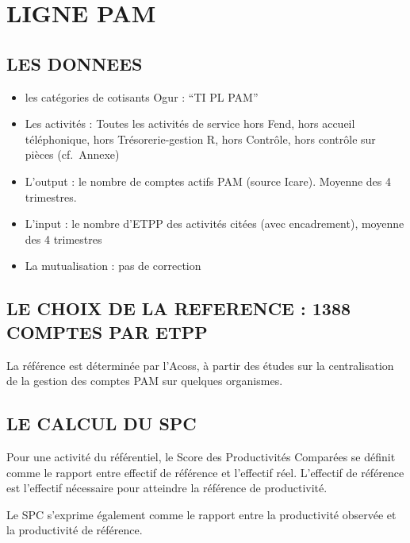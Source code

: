 \documentclass[
]{book}
\begin{document}
\hypertarget{ligne-pam}{%
\chapter{LIGNE PAM}\label{ligne-pam}}

\hypertarget{les-donnees-9}{%
\section{LES DONNEES}\label{les-donnees-9}}

\begin{itemize}
\item
  les catégories de cotisants Ogur : ``TI PL PAM''
\item
  Les activités :
  Toutes les activités de service hors Fend, hors accueil téléphonique, hors Trésorerie-gestion R, hors Contrôle, hors contrôle sur pièces (cf.~Annexe)
\item
  L'output : le nombre de comptes actifs PAM (source Icare). Moyenne des 4 trimestres.
\item
  L'input : le nombre d'ETPP des activités citées (avec encadrement), moyenne des 4 trimestres
\item
  La mutualisation : pas de correction
\end{itemize}

\hypertarget{le-choix-de-la-reference-1388-comptes-par-etpp}{%
\section{LE CHOIX DE LA REFERENCE : 1388 COMPTES PAR ETPP}\label{le-choix-de-la-reference-1388-comptes-par-etpp}}

La référence est déterminée par l'Acoss, à partir des études sur la centralisation de la gestion des comptes PAM sur quelques organismes.

\hypertarget{le-calcul-du-spc-6}{%
\section{LE CALCUL DU SPC}\label{le-calcul-du-spc-6}}

Pour une activité du référentiel, le Score des Productivités Comparées se définit comme le rapport entre effectif de référence et l'effectif réel. L'effectif de référence est l'effectif nécessaire pour atteindre la référence de productivité.

Le SPC s'exprime également comme le rapport entre la productivité observée et la productivité de référence.
\end{document}
